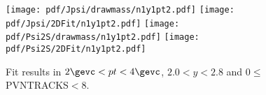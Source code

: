 \begin{figure}[H]
\begin{center}
\texttt{[image: pdf/Jpsi/drawmass/n1y1pt2.pdf]}
\texttt{[image: pdf/Jpsi/2DFit/n1y1pt2.pdf]}
\vspace*{-0.5cm}
\texttt{[image: pdf/Psi2S/drawmass/n1y1pt2.pdf]}
\texttt{[image: pdf/Psi2S/2DFit/n1y1pt2.pdf]}
\vspace*{-0.5cm}
\end{center}
\caption{Fit results in $2\gevc<pt<4\gevc$, $2.0<y<2.8$ and 0$\leq$PVNTRACKS$<$8.}
\label{Fitn1y1pt2}
\end{figure}
